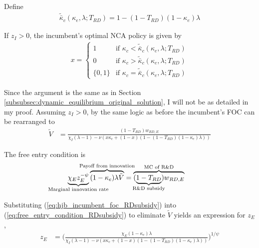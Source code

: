\documentclass[11pt,english]{article}
\theoremstyle{remark}
\begin{document}
Define
\begin{align}
	\tilde{\bar{\kappa}}_c(\kappa_e,\lambda;T_{RD}) = 1 - (1-T_{RD})(1-\kappa_e)\lambda
\end{align} 

If $z_I > 0$, the incumbent's optimal NCA policy is given by 
\begin{align}
x = \begin{cases}
1 & \textrm{if } \kappa_{c} < \tilde{\bar{\kappa}}_c (\kappa_e, \lambda;T_{RD}) \\
0 & \textrm{if } \kappa_{c} > \tilde{\bar{\kappa}}_c (\kappa_e, \lambda;T_{RD})\\
\{0,1\} & \textrm{if } \kappa_c = \tilde{\bar{\kappa}}_c (\kappa_e, \lambda;T_{RD})
\end{cases} \label{eq:nca_policy_RDsubsidy}
\end{align}

Since the argument is the same as in Section \ref{subsubsec:dynamic_equilibrium_original_solution}, I will not be as detailed in my proof. Assuming $z_I > 0$, by the same logic as before the incumbent's FOC can be rearranged to
\begin{align}
	\tilde{V} &= \frac{(1-T_{RD})w_{RD,E}}{\chi_I(\lambda -1) - \nu (x\kappa_c + (1-x)(1 - (1-T_{RD})(1-\kappa_e)\lambda)) } \label{eq:hjb_incumbent_foc_RDsubsidy}
\end{align}

The free entry condition is
\begin{align}
\underbrace{\chi_E z_E^{-\psi}}_{\mathclap{\text{Marginal innovation rate}}} \overbrace{(1-\kappa_e) \lambda \tilde{V}}^{\mathclap{\text{Payoff from innovation}}} &= \overbrace{(\underbrace{1-T_{RD}}_{\mathclap{\text{R\&D subsidy}}})w_{RD,E}}^{\mathclap{\text{MC of R\&D}}} \label{eq:free_entry_condition_RDsubsidy}
\end{align}

Substituting (\ref{eq:hjb_incumbent_foc_RDsubsidy}) into (\ref{eq:free_entry_condition_RDsubsidy}) to eliminate $\tilde{V}$ yields an expression for $z_E$, 
\begin{align}
z_E &= \Bigg( \frac{\chi_E (1-\kappa_{e}) \lambda}{\chi_I(\lambda -1) - \nu (x\kappa_c + (1-x)(1 - (1-T_{RD})(1-\kappa_e)\lambda)) } \Bigg)^{1/\psi} \label{eq:effort_entrant_RDsubsidy}
\end{align}
\end{document}
